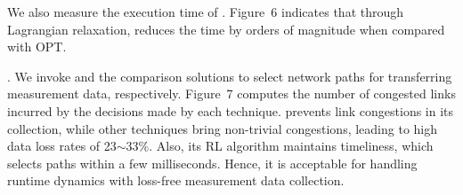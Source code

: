 We also measure the execution time of \sysname. Figure~6 indicates that through Lagrangian relaxation, \sysname reduces the time by orders of magnitude when compared with OPT. 


. We invoke \sysname and the comparison solutions to select network paths for transferring measurement data, respectively. Figure~7 computes the number of congested links incurred by the decisions made by each technique. \sysname prevents link congestions in its collection, while other techniques bring non-trivial congestions, leading to high data loss rates of 23$\sim$33\%. Also, its RL algorithm maintains timeliness, which selects paths within a few milliseconds. Hence, it is acceptable for handling runtime dynamics with loss-free measurement data collection. 



